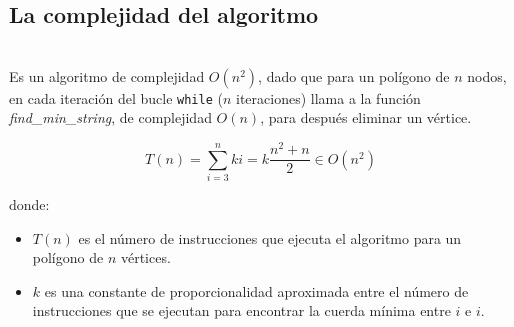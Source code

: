 \documentclass[compress]{beamer}
\begin{document}
\subsection{La complejidad del algoritmo}
\hfill\\
Es un algoritmo de complejidad $O(n^2)$, dado que para un polígono de $n$ nodos, en cada iteración del bucle \texttt{while} ($n$ iteraciones) llama a la función \textit{find\_min\_string}, de complejidad $O(n)$, para después eliminar un vértice.

\[
T(n) = \sum_{i=3}^n ki = k\frac{n^2+n}{2} \in O(n^2)
\]

donde:
\begin{itemize}
\item $T(n)$ es el número de instrucciones que ejecuta el algoritmo para un polígono de $n$ vértices.
\item $k$ es una constante de proporcionalidad aproximada entre el número de instrucciones que se ejecutan para encontrar la cuerda mínima entre $i$ e $i$. 
	
\end{itemize}
\end{document}
